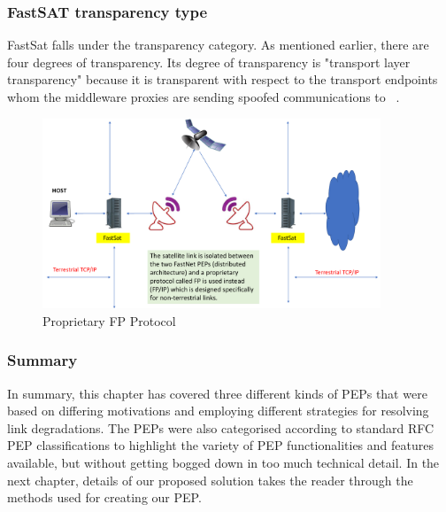 \subsubsection*{FastSAT transparency type}
FastSat falls under the transparency category. As mentioned earlier, there are four degrees of transparency. Its degree of transparency is "transport layer transparency" because it is transparent with respect to the transport endpoints whom the middleware proxies are sending spoofed communications to ~\cite{34}. \\

\begin{figure}[ht!]
    \centering
    \includegraphics[width=0.9\textwidth]{FP.pdf}
    \caption{Proprietary FP Protocol}
    \label{FastSat}
\end{figure}

\subsubsection*{Summary}
In summary, this chapter has covered three different kinds of PEPs that were based on differing motivations and employing different strategies for resolving link degradations. The PEPs were also categorised according to standard RFC PEP classifications to highlight the variety of PEP functionalities and features available, but without getting bogged down in too much technical detail.  In the next chapter, details of our proposed solution takes the reader through the methods used for creating our PEP.



